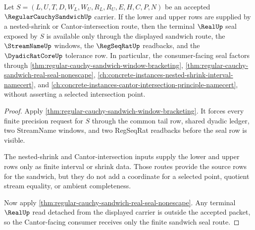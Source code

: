 \begin{theorem}
\label{thm:regular-cauchy-sandwich-cantor-intersection-seal}
Let $S=(L,U,T,D,W_L,W_U,R_L,R_U,E,H,C,P,N)$ be an accepted $\RegularCauchySandwichUp$ carrier. If the lower and upper rows are supplied by a nested-shrink or Cantor-intersection route, then the terminal $\RealUp$ seal exposed by $S$ is available only through the displayed sandwich route, the $\StreamNameUp$ windows, the $\RegSeqRatUp$ readbacks, and the $\DyadicRatCoreUp$ tolerance row. In particular, the consumer-facing seal factors through \autoref{thm:regular-cauchy-sandwich-window-bracketing}, \autoref{thm:regular-cauchy-sandwich-real-seal-nonescape}, \autoref{ch:concrete-instances-nested-shrink-interval-namecert}, and \autoref{ch:concrete-instances-cantor-intersection-principle-namecert}, without asserting a selected intersection point.
\end{theorem}
\begin{proof}
Apply \autoref{thm:regular-cauchy-sandwich-window-bracketing}. It forces every finite precision request for $S$ through the common tail row, shared dyadic ledger, two StreamName windows, and two RegSeqRat readbacks before the seal row is visible.

The nested-shrink and Cantor-intersection inputs supply the lower and upper rows only as finite interval or shrink data. Those routes provide the source rows for the sandwich, but they do not add a coordinate for a selected point, quotient stream equality, or ambient completeness.

Now apply \autoref{thm:regular-cauchy-sandwich-real-seal-nonescape}. Any terminal $\RealUp$ read detached from the displayed carrier is outside the accepted packet, so the Cantor-facing consumer receives only the finite sandwich seal route.
\end{proof}


